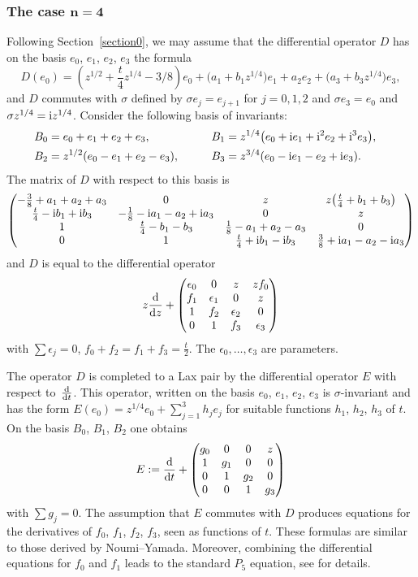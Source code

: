 \documentclass[pdftex]{sigma}
\numberwithin{equation}{section}
\begin{document}
\subsubsection[The case n=4]{The case $\boldsymbol{n=4}$}\label{section2.2.1}
Following Section~\ref{section0}, we may assume that the differential operator $D$ has on the basis $e_0$, $e_1$, $e_2$, $e_3$ the
 formula
 \[D(e_0)=\left(z^{1/2}+\frac{t}{4} z^{1/4}-3/8\right) e_0 +\bigl(a_1+b_1z^{1/4}\bigr) e_1+a_2 e_2+\bigl(a_3+b_3z^{1/4}\bigr) e_3, \]
 and $D$ commutes with $\sigma$ defined by $\sigma e_j=e_{j+1}$ for $j=0,1,2$ and $\sigma e_3=e_0$ and
 $\sigma z^{1/4}={\rm i}z^{1/4}$.
 Consider the following basis of invariants:
 \begin{alignat*}{3}
& B_0=e_0+e_1+e_2+e_3,\qquad && B_1=z^{1/4}\bigl(e_0+{\rm i}e_1+{\rm i}^2e_2+{\rm i}^3e_3\bigr),& \\
& B_2=z^{1/2}(e_0-e_1+e_2-e_3),\qquad && B_3=z^{3/4}(e_0-{\rm i}e_1-e_2+{\rm i}e_3).&
\end{alignat*}
 The matrix of $D$ with respect to this basis is
\[ \begin{pmatrix} -\frac{3}{8}+a_1+a_2+a_3 & 0 & z & z\bigl(\frac{t}{4}+b_1+b_3\bigr) \\
 \frac{t}{4}-{\rm i}b_1+{\rm i}b_3 & -\frac{1}{8}-{\rm i}a_1-a_2+{\rm i}a_3 & 0 &z \\
 1 &\frac{t}{4}-b_1-b_3 &\frac{1}{8}-a_1+a_2-a_3 & 0 \\
 0 & 1 & \frac{t}{4}+{\rm i}b_1-{\rm i}b_3 &\frac{3}{8}+{\rm i}a_1-a_2-{\rm i}a_3
 \end{pmatrix} \]
 and $D$ is equal to the differential operator
 \[
 z\frac{{\rm d}}{{\rm d}z}+\begin{pmatrix} \epsilon_0&0&z&zf_0\\
 f_1&\epsilon_1&0&z\\ 1&f_2&\epsilon_2& 0\\ 0&1&f_3&\epsilon_3 \end{pmatrix}
 \]
 with $\sum \epsilon _j=0$, $f_0+f_2=f_1+f_3=\frac{t}{2}$. The $\epsilon_0,\dots ,\epsilon_3$ are parameters.

 The operator $D$ is completed to a Lax pair by the differential operator $E$ with respect to~$\frac{{\rm d}}{{\rm d}t}$. This
 operator, written on the basis $e_0$, $e_1$, $e_2$, $e_3$ is $\sigma$-invariant and has the form
 $E(e_0)=z^{1/4}e_0+\sum _{j=1}^3h_je_j$ for suitable functions $h_1$, $h_2$, $h_3$ of $t$. On the basis
 $B_0 $, $B_1$, $B_2$ one obtains
 \[
 E:=\frac{{\rm d}}{{\rm d}t}+ \begin{pmatrix}g_0& 0& 0&z\\ 1&g_1&0&0\\0&1&g_2&0\\0&0&1&g_3 \end{pmatrix}
 \]
 with $\sum g_j=0$. The assumption that $E$ commutes with $D$ produces equations for
 the derivatives of $f_0$, $f_1$, $f_2$, $f_3$, seen as functions of $t$. These formulas are similar to those derived by
 Noumi--Yamada. Moreover, combining the differential equations for $f_0$ and $f_1$ leads to the standard $P_5$ equation,
 see \cite{N-Y,S-H-C} for details.
\end{document}
